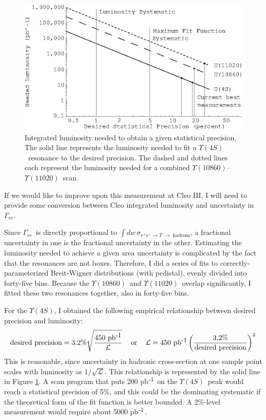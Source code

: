 \documentclass[12pt]{article}
\def\yivs{$\Upsilon(4S)$}
\def\yvs{$\Upsilon(10860)$}
\def\yvis{$\Upsilon(11020)$}
\def\gamee{$\Gamma_{ee}$}
\begin{document}
\begin{figure}[t]
  \begin{center}
    \includegraphics[width=0.75\linewidth]{cleo_lumi_needed.eps}
  \end{center}

  \caption{Integrated luminosity needed to obtain a given statistical
  precision. The solid line represents the luminosity needed to fit a
  \yivs\ resonance to the desired precision. The dashed and dotted
  lines each represent the luminosity needed for a combined
  \yvs--\yvis\ scan.}

  \label{fig:lumi}
\end{figure}

If we would like to improve upon this measurement at {\sc Cleo III}, I
will need to provide some conversion between {\sc Cleo} integrated
luminosity and uncertainty in \gamee.

Since \gamee\ is directly proportional to $\int dw\,
\sigma_{\mbox{e$^+$e$^-$} \to \Upsilon\ \to \mbox{ hadrons}}$, a
fractional uncertainty in one is the fractional uncertainty in the
other. Estimating the luminosity needed to achieve a given area
uncertainty is complicated by the fact that the resonances are not
boxes. Therefore, I did a series of fits to correctly-parameterized
Breit-Wigner distributions (with pedistal), evenly divided into
forty-five bins. Because the \yvs\ and \yvis\ overlap significantly, I
fitted these two resonances together, also in forty-five bins.

For the \yivs, I obtained the following empirical relationship between
desired precision and luminosity:
\begin{equation}
  \mbox{desired precision} = \mbox{3.2\%} \sqrt{\frac{\mbox{450 pb$^{\mbox{\small -1}}$}}{\mathcal{L}}}
  \hspace{3mm} \mbox{ or } \hspace{3mm} 
  \mathcal{L} = \mbox{450 pb$^{\mbox{\small -1}}$} \left(\frac{\mbox{3.2\%}}{\mbox{desired precision}}\right)^2
\end{equation}
This is reasonable, since uncertainty in hadronic cross-section at one
sample point scales with luminosity as $1/\sqrt{\mathcal{L}}$. This
relationship is represented by the solid line in Figure
\ref{fig:lumi}. A scan program that puts 200 pb$^{\mbox{\small -1}}$ on the
\yivs\ peak would reach a statistical precision of 5\%, and this could
be the dominating systematic if the theoretical form of the fit
function is better bounded. A 2\%-level measurement would require
about 5000 pb$^{\mbox{\small -1}}$.
\end{document}
